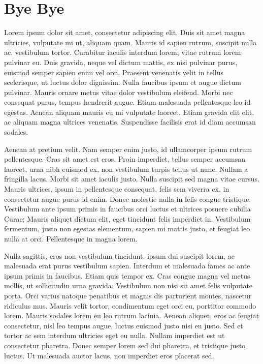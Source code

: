 \section{Bye Bye}


Lorem ipsum dolor sit amet, consectetur adipiscing elit. Duis sit amet magna ultricies, vulputate mi ut, aliquam quam. Mauris id sapien rutrum, suscipit nulla ac, vestibulum tortor. Curabitur iaculis interdum lorem, vitae rutrum lorem pulvinar eu. Duis gravida, neque vel dictum mattis, ex nisi pulvinar purus, euismod semper sapien enim vel orci. Praesent venenatis velit in tellus scelerisque, ut luctus dolor dignissim. Nulla faucibus ipsum et augue dictum pulvinar. Mauris ornare metus vitae dolor vestibulum eleifend. Morbi nec consequat purus, tempus hendrerit augue. Etiam malesuada pellentesque leo id egestas. Aenean aliquam mauris eu mi vulputate laoreet. Etiam gravida elit elit, ac aliquam magna ultrices venenatis. Suspendisse facilisis erat id diam accumsan sodales.

Aenean at pretium velit. Nam semper enim justo, id ullamcorper ipsum rutrum pellentesque. Cras sit amet est eros. Proin imperdiet, tellus semper accumsan laoreet, urna nibh euismod ex, non vestibulum turpis tellus ut nunc. Nullam a fringilla lacus. Morbi sit amet iaculis justo. Nulla suscipit sed magna vitae cursus. Mauris ultrices, ipsum in pellentesque consequat, felis sem viverra ex, in consectetur augue purus id enim. Donec molestie nulla in felis congue tristique. Vestibulum ante ipsum primis in faucibus orci luctus et ultrices posuere cubilia Curae; Mauris aliquet dictum elit, eget tincidunt felis imperdiet in. Vestibulum fermentum, justo non egestas elementum, sapien mi mattis justo, et feugiat leo nulla at orci. Pellentesque in magna lorem.

Nulla sagittis, eros non vestibulum tincidunt, ipsum dui suscipit lorem, ac malesuada erat purus vestibulum sapien. Interdum et malesuada fames ac ante ipsum primis in faucibus. Etiam quis tempor ex. Cras congue magna vel metus mollis, ut sollicitudin urna gravida. Vestibulum non nisi sit amet felis vulputate porta. Orci varius natoque penatibus et magnis dis parturient montes, nascetur ridiculus mus. Mauris velit tortor, condimentum eget orci eu, porttitor commodo lorem. Mauris sodales lorem eu leo rutrum lacinia. Aenean aliquet, eros ac feugiat consectetur, nisl leo tempus augue, luctus euismod justo nisi eu justo. Sed et tortor ac sem interdum ultricies eget eu nulla. Nullam imperdiet est ut consectetur pharetra. Donec semper lorem sed dui pharetra, et tristique justo luctus. Ut malesuada auctor lacus, non imperdiet eros placerat sed.

